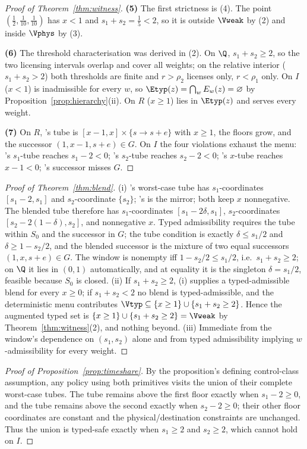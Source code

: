 \begin{proof}[Proof of Theorem~\ref{thm:witness}]
\textbf{(5)} The first strictness is (4). The point $(\tfrac12,\tfrac1{10},\tfrac1{10})$ has $x<1$ and $s_1+s_2=\tfrac15<2$, so it is outside $\Vweak$ by (2) and inside $\Vphys$ by (3).

\textbf{(6)} The threshold characterisation was derived in (2). On $\Q$, $s_1+s_2\ge2$, so the two licensing intervals overlap and cover all weights; on the relative interior ($s_1+s_2>2$) both thresholds are finite and $r>\rho_2$ licenses  only, $r<\rho_1$  only. On $I$ ($x<1$)  is inadmissible for every $w$, so $\Etyp(z)=\bigcap_wE_w(z)=\varnothing$ by Proposition~\ref{prop:hierarchy}(ii). On $R$ ($x\ge1$)  lies in $\Etyp(z)$ and serves every weight.

\textbf{(7)} On $R$, 's tube is $[x-1,x]\times\{s\to s+e\}$ with $x\ge1$, the floors grow, and the successor $(1,x-1,s+e)\in G$. On $I$ the four violations exhaust the menu: 's $s_1$-tube reaches $s_1-2<0$; 's $s_2$-tube reaches $s_2-2<0$; 's $x$-tube reaches $x-1<0$; 's successor misses $G$.
\end{proof}

\begin{proof}[Proof of Theorem~\ref{thm:blend}]
(i) 's worst-case tube has $s_1$-coordinates $[s_1-2,s_1]$ and $s_2$-coordinate $\{s_2\}$; 's is the mirror; both keep $x$ nonnegative. The blended tube therefore has $s_1$-coordinates $[s_1-2\delta,s_1]$, $s_2$-coordinates $[s_2-2(1-\delta),s_2]$, and nonnegative $x$. Typed admissibility requires the tube within $S_0$ and the successor in $G$; the tube condition is exactly $\delta\le s_1/2$ and $\delta\ge1-s_2/2$, and the blended successor is the mixture of two equal successors $(1,x,s+e)\in G$. The window is nonempty iff $1-s_2/2\le s_1/2$, i.e.\ $s_1+s_2\ge2$; on $\Q$ it lies in $(0,1)$ automatically, and at equality it is the singleton $\delta=s_1/2$, feasible because $S_0$ is closed.
(ii) If $s_1+s_2\ge2$, (i) supplies a typed-admissible blend for every $x\ge0$; if $s_1+s_2<2$ no blend is typed-admissible, and the deterministic menu contributes $\Vtyp\subseteq\{x\ge1\}\cup\{s_1+s_2\ge2\}$. Hence the augmented typed set is $\{x\ge1\}\cup\{s_1+s_2\ge2\}=\Vweak$ by Theorem~\ref{thm:witness}(2), and nothing beyond.
(iii) Immediate from the window's dependence on $(s_1,s_2)$ alone and from typed admissibility implying $w$-admissibility for every weight.
\end{proof}

\begin{proof}[Proof of Proposition~\ref{prop:timeshare}]
By the proposition's defining control-class assumption, any policy using both primitives visits the union of their complete worst-case tubes. The  tube remains above the first floor exactly when $s_1-2\ge0$, and the  tube remains above the second exactly when $s_2-2\ge0$; their other floor coordinates are constant and the physical/destination constraints are unchanged. Thus the union is typed-safe exactly when $s_1\ge2$ and $s_2\ge2$, which cannot hold on $I$.
\end{proof}

